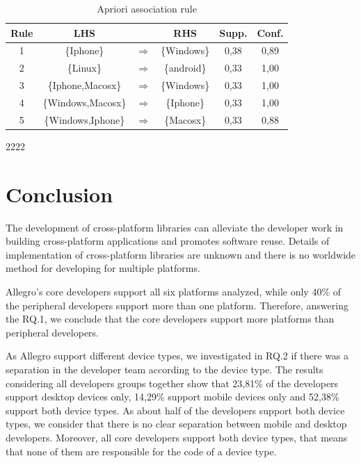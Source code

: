 \documentclass[10pt, conference]{IEEEtran}
\begin{document}
\begin{table}[h]
\renewcommand{\arraystretch}{1.3}
\caption{Apriori association rule}
\label{assocrule}
\centering
\begin{tabular}{|c|c c c|c|c|}
\hline
 Rule	&LHS & &RHS	& Supp. & Conf. \\
\hline
1&	\{Iphone\} 			&$\Rightarrow$	& 	\{Windows\} & 	0,38	&  	0,89	\\
\hline
2&	\{Linux\} 			& $\Rightarrow$ & 	\{android\} & 	0,33	&  	1,00 	\\
\hline
3&	\{Iphone,Macosx\}	&$\Rightarrow$	& 	\{Windows\} & 	0,33	& 	1,00	\\
\hline
4&	\{Windows,Macosx\} &$\Rightarrow$&  	\{Iphone\} 	& 	0,33	& 	1,00	\\
\hline
5&	\{Windows,Iphone\} &$\Rightarrow$& 		\{Macosx\} 	& 	0,33	&  	0,88	\\
\hline
\end{tabular}
\end{table} 

2222




\section{Conclusion}
\label{conclusion}

The development of cross-platform libraries can alleviate the developer work in building cross-platform applications and promotes software reuse. Details of implementation of cross-platform libraries are unknown and there is no worldwide method for developing for multiple platforms. %

Allegro's core developers support all six platforms analyzed, while only 40\% of the peripheral developers support more than one platform. Therefore, answering the RQ.1, we conclude that the core developers support more platforms than peripheral developers. 

As Allegro support different device types, we investigated in RQ.2 if there was a separation in the developer team according to the device type. The results considering all developers groups together show that 23,81\% of the developers support desktop devices only, 14,29\% support mobile devices only and 52,38\% support both device types. As about half of the developers support both device types, we consider that there is no clear separation between mobile and desktop developers. Moreover, all core developers support both device types, that means that none of them are responsible for the code of a device type.  
\end{document}
